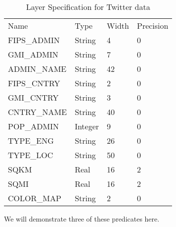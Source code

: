 \documentclass[conference]{IEEEtran}
\begin{document}
\begin{table}[]
\caption{Layer Specification for Twitter data}
\label{Table 2}
\centering
\begin{tabular}{llll}
Name        & Type    & Width & Precision \\
FIPS\_ADMIN & String  & 4     & 0         \\
GMI\_ADMIN  & String  & 7     & 0         \\
ADMIN\_NAME & String  & 42    & 0         \\
FIPS\_CNTRY & String  & 2     & 0         \\
GMI\_CNTRY  & String  & 3     & 0         \\
CNTRY\_NAME & String  & 40    & 0         \\
POP\_ADMIN  & Integer & 9     & 0         \\
TYPE\_ENG   & String  & 26    & 0         \\
TYPE\_LOC   & String  & 50    & 0         \\
SQKM        & Real    & 16    & 2         \\
SQMI        & Real    & 16    & 2         \\
COLOR\_MAP  & String  & 2     & 0        
\end{tabular}
\end{table}

We will demonstrate three of these predicates here.
\end{document}
